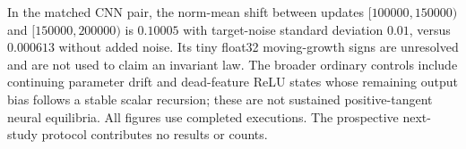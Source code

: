 In the matched CNN pair, the norm-mean shift between updates
$[100000,150000)$ and $[150000,200000)$ is $0.10005$ with target-noise
standard deviation $0.01$, versus $0.000613$ without added noise.
Its tiny float32 moving-growth signs are unresolved and are not used to claim an invariant law.
The broader ordinary controls include continuing parameter drift and dead-feature ReLU states
whose remaining output bias follows a stable scalar recursion; these are not sustained
positive-tangent neural equilibria.
All figures use completed executions. The prospective next-study protocol contributes no results or counts.
\clearpage
